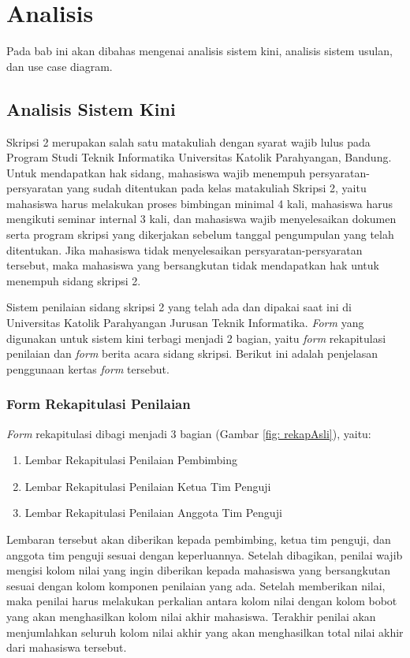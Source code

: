 \chapter{Analisis}
\label{chap: analisis}

Pada bab ini akan dibahas mengenai analisis sistem kini, analisis sistem usulan, dan use case diagram.

\section{Analisis Sistem Kini}
\label{sec: analisiSKini}

Skripsi 2 merupakan salah satu matakuliah dengan syarat wajib lulus pada Program Studi Teknik Informatika Universitas Katolik Parahyangan, Bandung. Untuk mendapatkan hak sidang, mahasiswa wajib menempuh persyaratan-persyaratan yang sudah ditentukan pada kelas matakuliah Skripsi 2, yaitu mahasiswa harus melakukan proses bimbingan minimal 4 kali, mahasiswa harus mengikuti seminar internal 3 kali, dan mahasiswa wajib menyelesaikan dokumen serta program skripsi yang dikerjakan sebelum tanggal pengumpulan yang telah ditentukan. Jika mahasiswa tidak menyelesaikan persyaratan-persyaratan tersebut, maka mahasiswa yang bersangkutan tidak mendapatkan hak untuk menempuh sidang skripsi 2.

Sistem penilaian sidang skripsi 2 yang telah ada dan dipakai saat ini di Universitas Katolik Parahyangan Jurusan Teknik Informatika. \textit{Form} yang digunakan untuk sistem kini terbagi menjadi 2 bagian, yaitu \textit{form} rekapitulasi penilaian dan \textit{form} berita acara sidang skripsi. Berikut ini adalah penjelasan penggunaan kertas \textit{form} tersebut.

	\subsection{Form Rekapitulasi Penilaian}
	\label{sub: rekapPenil}
	
	\textit{Form} rekapitulasi dibagi menjadi 3 bagian (Gambar \ref{fig: rekapAsli}), yaitu:
		\begin{enumerate}
			\item Lembar Rekapitulasi Penilaian Pembimbing
			\item Lembar Rekapitulasi Penilaian Ketua Tim Penguji
			\item Lembar Rekapitulasi Penilaian Anggota Tim Penguji
		\end{enumerate}
	
	Lembaran tersebut akan diberikan kepada pembimbing, ketua tim penguji, dan anggota tim penguji sesuai dengan keperluannya. Setelah dibagikan, penilai wajib mengisi kolom nilai yang ingin diberikan kepada mahasiswa yang bersangkutan sesuai dengan kolom komponen penilaian yang ada. Setelah memberikan nilai, maka penilai harus melakukan perkalian antara kolom nilai dengan kolom bobot yang akan menghasilkan kolom nilai akhir mahasiswa. Terakhir penilai akan menjumlahkan seluruh kolom nilai akhir yang akan menghasilkan total nilai akhir dari mahasiswa tersebut.
	
